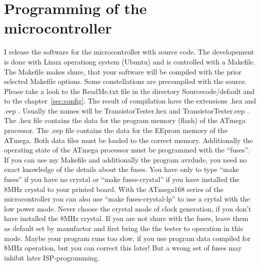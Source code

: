 \section{Programming of the microcontroller}
I release the software for the microcontroller with source code.
The developement is done with Linux operationg system (Ubuntu) and
is controlled with a Makefile. The Makefile makes shure, that your
software will be compiled with the prior selected Makefile options. Some constellations
are precompiled with the source. Please take a look to the ReadMe.txt file
in the directory Sourcecode/default and to the chapter~\ref{sec:config}.
The result of compilation have the extensions .hex and .eep .
Usually the names will be TransistorTester.hex and TransistorTester.eep .
The .hex file contains the data for the program memory (flash) of the ATmega processor.
The .eep file contains the data for the EEprom memory of the ATmega. Both data files
must be loaded to the correct memory. Additionally the operating state of the
ATmega processor must be programmed with the ``fuses''.
If you can use my Makefile and additionally the program avrdude, you need no exact
knowledge of the details about the fuses. You have only to type ``make fuses'' if you
have no crystal or ``make fuses-crystal'' if you have installed the 8MHz crystal to your printed board.
With the ATmega168 series of the microcontroller you can also use ``make fuses-crystal-lp'' to use
a crytal with the low power mode.
Never choose the crystal mode of clock generation, if you don't have installed
the 8MHz crystal. If you are not shure with the fuses, leave them as default
set by manufactor and first bring the the tester to operation in this mode.
Maybe your program runs too slow, if you use program data compiled for
8MHz operation, but you can correct this later! But a wrong set of fuses may inhibit
later ISP-programming.

